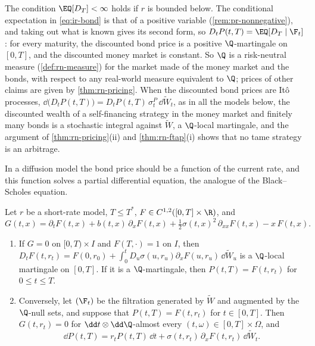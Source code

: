 The condition $\EQ[D_T]<\infty$ holds if $r$ is bounded below. The conditional expectation in
\eqref{eq:ir-bond} is that of a positive variable (\cref{rem:pr-nonnegative}), and taking out what
is known gives its second form, so $D_tP(t,T)=\EQ[D_T\mid\F_t]$: for every maturity, the
discounted bond price is a positive $\Q$-martingale on $[0,T]$, and the discounted money market
is constant. So $\Q$ is a risk-neutral measure (\cref{def:rn-measure}) for the market made of
the money market and the bonds, with respect to any real-world measure equivalent to $\Q$; prices
of other claims are given by \cref{thm:rn-pricing}. When the discounted bond prices are It\^o
processes, $\dd\big(D_tP(t,T)\big)=D_tP(t,T)\,\sigma^P_t\,\dd\widetilde W_t$, as in all the models
below, the discounted wealth of a self-financing strategy in the money market and finitely many
bonds is a stochastic integral against $\widetilde W$, a $\Q$-local martingale, and the argument
of \cref{thm:rn-pricing}(ii) and \cref{thm:rn-ftap}(i) shows that no tame strategy is an
arbitrage.

In a diffusion model the bond price should be a function of the current rate, and this function
solves a partial differential equation, the analogue of the Black--Scholes equation.

\begin{proposition}\label{prop:ir-pde}
Let $r$ be a short-rate model, $T\le T^*$, $F\in C^{1,2}([0,T]\times\R)$, and
\[
  G(t,x)=\partial_tF(t,x)+b(t,x)\,\partial_xF(t,x)+\tfrac12\sigma(t,x)^2\,\partial_{xx}F(t,x)-x\,F(t,x).
\]
\begin{enumerate}[label=(\roman*)]
  \item If $G=0$ on $[0,T)\times I$ and $F(T,\cdot)=1$ on $I$, then
    $D_tF(t,r_t)=F(0,r_0)+\int_0^tD_u\sigma(u,r_u)\partial_xF(u,r_u)\,\dd\widetilde W_u$ is a
    $\Q$-local martingale on $[0,T]$. If it is a $\Q$-martingale, then $P(t,T)=F(t,r_t)$ for
    $0\le t\le T$.
  \item Conversely, let $(\F_t)$ be the filtration generated by $\widetilde W$ and augmented by the
    $\Q$-null sets, and suppose that $P(t,T)=F(t,r_t)$ for $t\in[0,T]$. Then $G(t,r_t)=0$ for
    $\dd t\otimes\dd\Q$-almost every $(t,\omega)\in[0,T]\times\Omega$, and
    \begin{equation}\label{eq:ir-bond-dynamics}
      \dd P(t,T)=r_tP(t,T)\,\dd t+\sigma(t,r_t)\,\partial_xF(t,r_t)\,\dd\widetilde W_t .
    \end{equation}
\end{enumerate}
\end{proposition}

